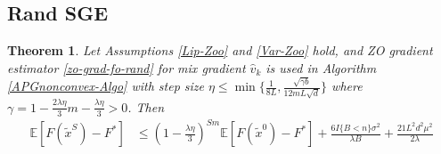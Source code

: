 \documentclass{article}
\newcommand*{\E}{\mathbb{E}}
\newtheorem{theorem}{Theorem}[section]
\theoremstyle{definition}
\theoremstyle{remark}
\begin{document}
\subsection{Rand SGE}
\begin{theorem}\label{PL-Zoo-rand}
Let Assumptions \ref{Lip-Zoo} and \ref{Var-Zoo} hold, and  ZO gradient estimator \eqref{zo-grad-fo-rand} for mix gradient $\hat{v}_k$ is used in
 Algorithm \ref{APGnonconvex-Algo} with step size $\eta \leq \min\{\frac{1}{8L}, \frac{\sqrt{\gamma b}}{12 m L \sqrt{d}}\}$ where $\gamma = 1-\frac{2\lambda\eta}{3} m-\frac{\lambda\eta}{3} > 0$. Then 
\begin{equation}\label{PL-eq-error}
\begin{split}
\E[F(\tilde{x}^S) - {F}^*] & \leq   \left(1-\frac{\lambda\eta}{3}\right)^{Sm} \E[F(\tilde{x}^0) - {F}^*] + \frac{6I\{B < n\} \sigma ^2}{\lambda B}+\frac{21 L^2 d^2 \mu^2}{2\lambda}
\end{split}
\end{equation}
\end{theorem}
\end{document}
